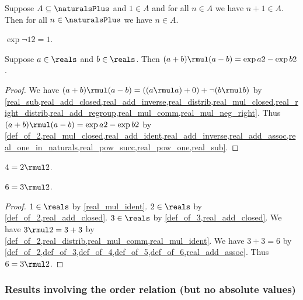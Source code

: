 \begin{proposition}\label{real_naturals_induction}
    Suppose $A\subseteq\naturalsPlus$ and $1\in A$ and for all $n\in A$ we have $n + 1\in A$.
    Then for all $n\in\naturalsPlus$ we have $n\in A$.
\end{proposition}

\begin{proposition}\label{real_neg_one_square}
    $\exp{\neg{1}}{2} = 1$.
\end{proposition}

\begin{proposition}\label{real_diff_squares}
    Suppose $a\in\reals$ and $b\in\reals$.
    Then $(a + b) \rmul (a - b) = \exp{a}{2} - \exp{b}{2}$.
\end{proposition}
\begin{proof}
    We have $(a + b) \rmul (a - b) = ((a \rmul a) + 0) + \neg{(b \rmul b)}$
        by \cref{real_sub,real_add_closed,real_add_inverse,real_distrib,real_mul_closed,real_right_distrib,real_add_regroup,real_mul_comm,real_mul_neg_right}.
    Thus $(a + b) \rmul (a - b) = \exp{a}{2} - \exp{b}{2}$ by \cref{def_of_2,real_mul_closed,real_add_ident,real_add_inverse,real_add_assoc,real_one_in_naturals,real_pow_succ,real_pow_one,real_sub}.
\end{proof}

\begin{lemma} \label{lemma_4_eq_2_times_2}
    $4 = 2 \rmul 2$.
\end{lemma}    

\begin{lemma} \label{lemma_6_eq_3_times_2}
    $6 = 3 \rmul 2$.
\end{lemma}    
\begin{proof}
    $1\in\reals$ by \cref{real_mul_ident}.
    $2\in\reals$ by \cref{def_of_2,real_add_closed}.
    $3\in\reals$ by \cref{def_of_3,real_add_closed}.
    We have $3 \rmul 2 = 3 + 3$ by \cref{def_of_2,real_distrib,real_mul_comm,real_mul_ident}.
    We have $3 + 3 = 6$ by \cref{def_of_2,def_of_3,def_of_4,def_of_5,def_of_6,real_add_assoc}.
    Thus $6 = 3 \rmul 2$.
\end{proof}

\subsubsection{Results involving the order relation (but no absolute values)}

